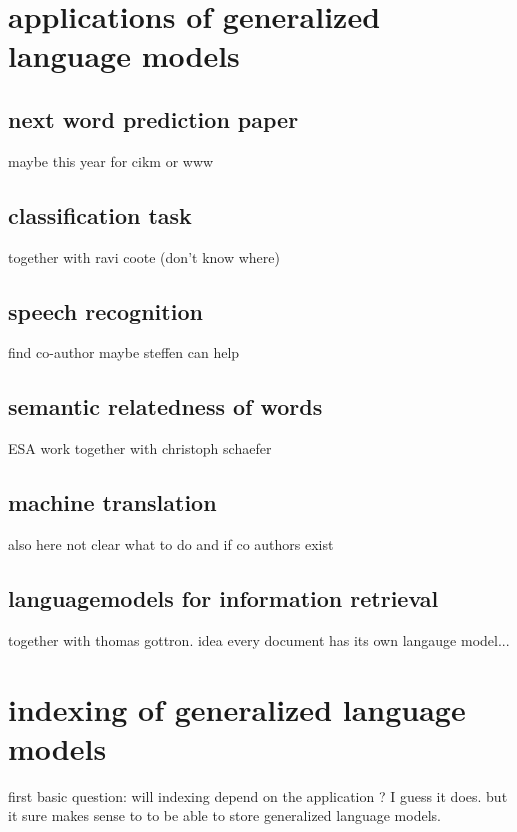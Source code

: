 \documentclass[•]{book}
\begin{document}
\chapter{applications of generalized language models}
\section{next word prediction paper}
maybe this year for cikm or www

\section{classification task}
together with ravi coote (don't know where)

\section{speech recognition}
find co-author maybe steffen can help

\section{semantic relatedness of words}
ESA work together with christoph schaefer

\section{machine translation}
also here not clear what to do and if co authors exist

\section{languagemodels for information retrieval}
together with thomas gottron. idea every document has its own langauge model...

\chapter{indexing of generalized language models}
first basic question: will indexing depend on the application ? I guess it does. but it sure makes sense to to be able to store generalized language models.
\end{document}
